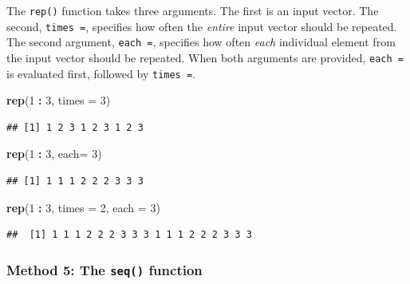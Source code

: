 \documentclass[]{book}
\newenvironment{Shaded}{\begin{snugshade}}{\end{snugshade}}
\newcommand{\DataTypeTok}[1]{\textcolor[rgb]{0.13,0.29,0.53}{#1}}
\newcommand{\DecValTok}[1]{\textcolor[rgb]{0.00,0.00,0.81}{#1}}
\newcommand{\KeywordTok}[1]{\textcolor[rgb]{0.13,0.29,0.53}{\textbf{#1}}}
\newcommand{\NormalTok}[1]{#1}
\newcommand{\OperatorTok}[1]{\textcolor[rgb]{0.81,0.36,0.00}{\textbf{#1}}}
\newcommand{\StringTok}[1]{\textcolor[rgb]{0.31,0.60,0.02}{#1}}
\begin{document}
The \texttt{rep()} function takes three arguments. The first is an input vector. The second, \texttt{times\ =}, specifies how often the \emph{entire} input vector should be repeated. The second argument, \texttt{each\ =}, specifies how often \emph{each} individual element from the input vector should be repeated. When both arguments are provided, \texttt{each\ =} is evaluated first, followed by \texttt{times\ =}.

\begin{Shaded}
\begin{Highlighting}[]
\KeywordTok{rep}\NormalTok{(}\DecValTok{1} \OperatorTok{:}\StringTok{ }\DecValTok{3}\NormalTok{, }\DataTypeTok{times =} \DecValTok{3}\NormalTok{)}
\end{Highlighting}
\end{Shaded}

\begin{verbatim}
## [1] 1 2 3 1 2 3 1 2 3
\end{verbatim}

\begin{Shaded}
\begin{Highlighting}[]
\KeywordTok{rep}\NormalTok{(}\DecValTok{1} \OperatorTok{:}\StringTok{ }\DecValTok{3}\NormalTok{, }\DataTypeTok{each=} \DecValTok{3}\NormalTok{)}
\end{Highlighting}
\end{Shaded}

\begin{verbatim}
## [1] 1 1 1 2 2 2 3 3 3
\end{verbatim}

\begin{Shaded}
\begin{Highlighting}[]
\KeywordTok{rep}\NormalTok{(}\DecValTok{1} \OperatorTok{:}\StringTok{ }\DecValTok{3}\NormalTok{, }\DataTypeTok{times =} \DecValTok{2}\NormalTok{, }\DataTypeTok{each =} \DecValTok{3}\NormalTok{)}
\end{Highlighting}
\end{Shaded}

\begin{verbatim}
##  [1] 1 1 1 2 2 2 3 3 3 1 1 1 2 2 2 3 3 3
\end{verbatim}

\hypertarget{method-5-the-seq-function}{%
\subsubsection*{\texorpdfstring{Method 5: The \texttt{seq()} function}{Method 5: The seq() function}}\label{method-5-the-seq-function}}
\end{document}
